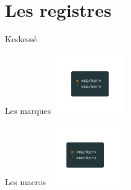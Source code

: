 \documentclass[10pt]{beamer}
\begin{document}
		\section{Les registres}
			\begin{frame}{Keskessé}
			\end{frame}

			\begin{frame}{Les marques}
				\center
				\includegraphics[height=100]{img/markers.png}
			\end{frame}

			\begin{frame}{Les macros}
				\center
				\includegraphics[height=100]{img/markers.png}
			\end{frame}
\end{document}
